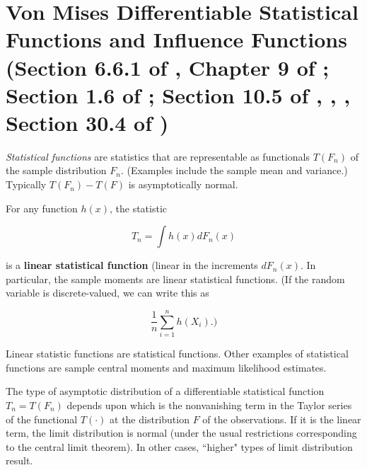 \section{Von Mises Differentiable Statistical Functions and Influence Functions (Section 6.6.1 of \citet{serfling1980}, Chapter 9 of \citet{demidenko2013mixed}; Section 1.6 of \citet{koroljuk1994theory}; Section 10.5 of \cite{Efron2016}, \citet{shao2012jackknife}, \citet{Hampel1974}, Section 30.4 of \citet{dasgupta2008asymptotic})}

\textit{Statistical functions} are statistics that are representable as functionals \(T(F_n)\) of the sample distribution \(F_n\). (Examples include the sample mean and variance.) Typically \(T(F_n) - T(F)\) is asymptotically normal.

\begin{definition}

For any function \(h(x)\), the statistic

\[
T_n = \int h(x) dF_n(x) 
\]

is a \textbf{linear statistical function} (linear in the increments \(dF_n(x)\). In particular, the sample moments are linear statistical functions. (If the random variable is discrete-valued, we can write this as

\[
\frac{1}{n} \sum_{i=1}^n h(X_i).)
\]

\end{definition}

\begin{example}

Linear statistic functions are statistical functions. Other examples of statistical functions are sample central moments and maximum likelihood estimates.

\end{example}

\begin{proposition}

The type of asymptotic distribution of a differentiable statistical function \(T_n = T(F_n)\) depends upon which is the nonvanishing term in the Taylor series of the functional \(T(\cdot)\) at the distribution \(F\) of the observations. If it is the linear term, the limit distribution is normal (under the usual restrictions corresponding to the central limit theorem). In other cases, ``higher" types of limit distribution result.

\end{proposition}


